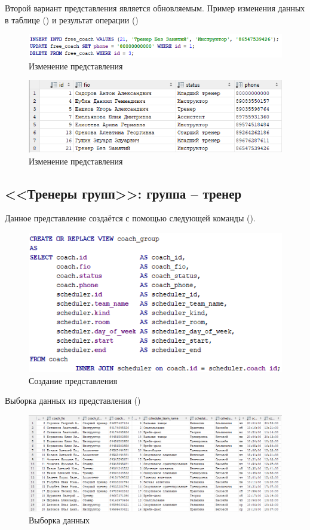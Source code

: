 \documentclass[a4paper,14pt]{article}
\begin{document}
	Второй вариант представления является обновляемым.
	Пример изменения данных в таблице () и результат операции ()

	\begin{figure}[H]
		\centering		
		\includegraphics[width=0.9\linewidth]{image/viewChange_01}
		\caption{Изменение представления}\label{img:viewChange_01}
	\end{figure}

	\begin{figure}[H]
		\centering		
		\includegraphics[width=0.7\linewidth]{image/viewResult_01}
		\caption{Изменение представления}\label{img:viewResult_01}
	\end{figure}

\subsection{<<Тренеры групп>>: группа – тренер}

	Данное представление создаётся с помощью следующей команды ().
	
	\begin{figure}[H]
		\centering		
		\includegraphics[width=0.7\linewidth]{image/viewCreate_02}
		\caption{Создание представления}\label{img:viewCreate_02}
	\end{figure}
	
	Выборка данных из представления ()
	
	\begin{figure}[H]
		\centering		
		\includegraphics[width=\linewidth]{image/viewSelect_02}
		\caption{Выборка данных}\label{img:viewSelect_02}
	\end{figure}
	
\end{document}
